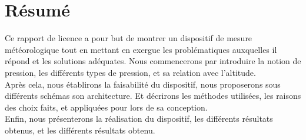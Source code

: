 \chapter*{Résumé}
 


	Ce rapport de licence a pour but de montrer un dispositif de mesure météorologique tout en mettant en exergue les problématiques auxquelles il répond et les solutions adéquates. Nous commencerons par introduire la notion de pression, les différents types de pression, et sa relation avec l'altitude.\\

Après cela, nous établirons la faisabilité du dispositif, nous proposerons sous différents schémas son architecture. Et décrirons les méthodes utilisées, les raisons des choix faits, et appliquées pour lors de sa conception.\\

Enfin, nous présenterons la réalisation du dispositif, les différents résultats obtenus, et les différents résultats obtenu.\\       
 

